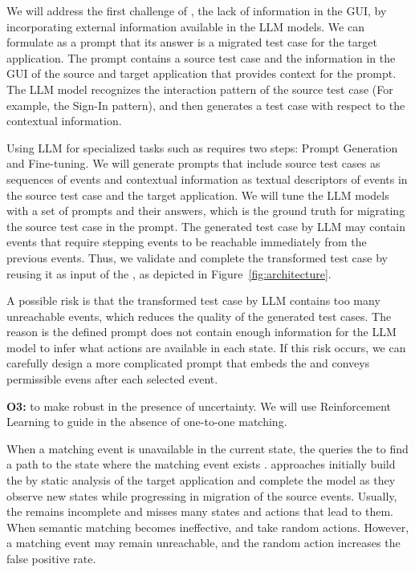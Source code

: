 \bigskip
We will  address the first challenge of \testreuse, the lack of information in the GUI, by incorporating external information available in the LLM models.
We can formulate \testreuse as a prompt that its answer is a migrated test case for the target application.
The prompt contains a source test case and the information in the GUI of the source and target application that provides context for the prompt. 
The LLM model recognizes the interaction pattern of the source test case (For example, the Sign-In pattern), and then generates a test case with respect to the contextual information.


\bigskip
Using LLM for specialized tasks such as \testreuse requires two steps: Prompt Generation and Fine-tuning. 
We will generate prompts that include source test cases as sequences of events and contextual information as textual descriptors of events in the source test case and the target application.
We will tune the LLM models with a set of prompts and their answers, which is the ground truth for migrating the source test case in the prompt.
The generated test case by LLM may contain events that require stepping events to be reachable immediately from the previous events.
 Thus, we validate and complete the transformed test case by reusing it as input of the \selector, as depicted in Figure~\ref{fig:architecture}. 



\bigskip
A possible risk is that the transformed test case by LLM contains too many unreachable events, which reduces the quality of the generated test cases.
The reason is the defined prompt does not contain enough information  for the LLM model to infer what actions are available in each state.
If this risk occurs, we can carefully design a more complicated prompt that embeds the \tam and conveys permissible evens after each selected event.




\bigskip
\noindent
\textbf{O3:} to make \testreuse robust in the presence of uncertainty. We will use Reinforcement Learning to guide \testreuse in the absence of one-to-one matching. 

\bigskip
When a matching event is unavailable in the current state, the \selector queries the \tam to find a path to the state where the matching event exists	.
\testreuse approaches initially build the \tam by static analysis of the target application and complete the model as they observe new states while progressing in migration of the source events. 
Usually, the \tam remains incomplete and misses many states and actions that lead to them.
When semantic matching becomes ineffective, \atm and \adaptdroid take random actions.  However, a matching event may remain unreachable, and the random action increases the false positive rate. 


